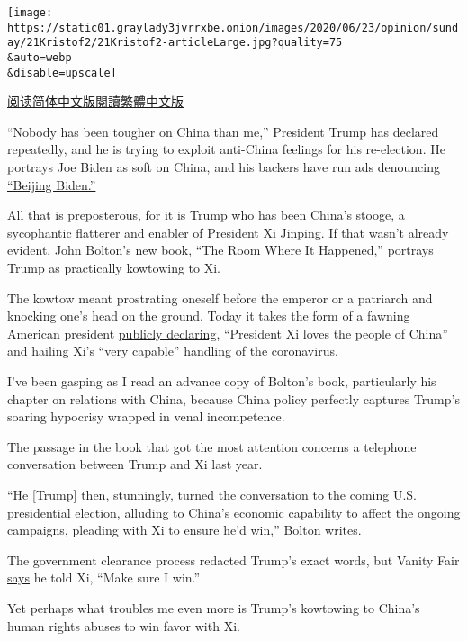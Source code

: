 \texttt{[image: https://static01.graylady3jvrrxbe.onion/images/2020/06/23/opinion/sunday/21Kristof2/21Kristof2-articleLarge.jpg?quality=75\\\&auto=webp\\\&disable=upscale]}

\href{https://cn.nytimes3xbfgragh.onion/opinion/20200623/trump-china-john-bolton-book/}{阅读简体中文版}\href{https://cn.nytimes3xbfgragh.onion/opinion/20200623/trump-china-john-bolton-book/zh-hant/}{閱讀繁體中文版}

``Nobody has been tougher on China than me,'' President Trump has
declared repeatedly, and he is trying to exploit anti-China feelings for
his re-election. He portrays Joe Biden as soft on China, and his backers
have run ads denouncing
\href{https://thehill.com/homenews/campaign/495649-pro-trump-group-releases-another-round-of-beijing-biden-ads-in-battleground}{``Beijing
Biden.''}

All that is preposterous, for it is Trump who has been China's stooge, a
sycophantic flatterer and enabler of President Xi Jinping. If that
wasn't already evident, John Bolton's new book, ``The Room Where It
Happened,'' portrays Trump as practically kowtowing to Xi.

The kowtow meant prostrating oneself before the emperor or a patriarch
and knocking one's head on the ground. Today it takes the form of a
fawning American president
\href{https://www.cnn.com/2020/04/21/politics/trump-china-praise-coronavirus-timeline/index.html}{publicly
declaring}, ``President Xi loves the people of China'' and hailing Xi's
``very capable'' handling of the coronavirus.

I've been gasping as I read an advance copy of Bolton's book,
particularly his chapter on relations with China, because China policy
perfectly captures Trump's soaring hypocrisy wrapped in venal
incompetence.

The passage in the book that got the most attention concerns a telephone
conversation between Trump and Xi last year.

``He {[}Trump{]} then, stunningly, turned the conversation to the coming
U.S. presidential election, alluding to China's economic capability to
affect the ongoing campaigns, pleading with Xi to ensure he'd win,''
Bolton writes.

The government clearance process redacted Trump's exact words, but
Vanity Fair
\href{https://www.vanityfair.com/news/2020/06/boltons-unredacted-book-shows-trump-trying-to-hide}{says}
he told Xi, ``Make sure I win.''

Yet perhaps what troubles me even more is Trump's kowtowing to China's
human rights abuses to win favor with Xi.

